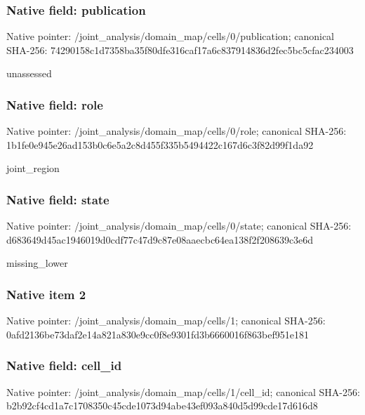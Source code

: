 \documentclass[10pt,a4paper]{article}
\begin{document}
\subsubsection{Native field: publication}
Native pointer: /joint\_\allowbreak{}analysis/domain\_\allowbreak{}map/cells/0/publication; canonical SHA-256: 74290158c1d7358ba35f80dfe316caf17a6c837914836d2fec5bc5cfac234003

\begingroup\raggedright\sloppy unassessed\par\endgroup

\subsubsection{Native field: role}
Native pointer: /joint\_\allowbreak{}analysis/domain\_\allowbreak{}map/cells/0/role; canonical SHA-256: 1b1fe0e945e26ad153b0c6e5a2c8d455f335b5494422c167d6c3f82d99f1da92

\begingroup\raggedright\sloppy joint\_\allowbreak{}region\par\endgroup

\subsubsection{Native field: state}
Native pointer: /joint\_\allowbreak{}analysis/domain\_\allowbreak{}map/cells/0/state; canonical SHA-256: d683649d45ac1946019d0cdf77c47d9c87e08aaecbc64ea138f2f208639c3e6d

\begingroup\raggedright\sloppy missing\_\allowbreak{}lower\par\endgroup

\subsubsection{Native item 2}
Native pointer: /joint\_\allowbreak{}analysis/domain\_\allowbreak{}map/cells/1; canonical SHA-256: 0afd2136be73daf2e14a821a830e9cc0f8e9301fd3b6660016f863bef951e181

\subsubsection{Native field: cell\_\allowbreak{}id}
Native pointer: /joint\_\allowbreak{}analysis/domain\_\allowbreak{}map/cells/1/cell\_\allowbreak{}id; canonical SHA-256: b2b92cf4cd1a7c1708350c45cde1073d94abe43ef093a840d5d99cde17d616d8
\end{document}
